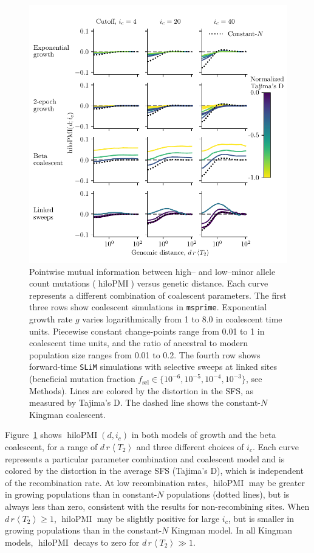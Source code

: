 \documentclass[11pt, letterpaper]{article}   	%
\newcommand{\Fig}[1]{Figure~\ref{#1}}
\newcommand{\E}[1]{\left< #1 \right>}
\DeclareMathOperator{\hilopmi}{hiloPMI}
\begin{document}
\begin{figure}
\centering
\includegraphics[scale=1]{figures/hilopmi_vs_distance.pdf}
\caption{Pointwise mutual information between high-- and low--minor allele count mutations ($\hilopmi$) versus genetic distance. Each curve represents a different combination of coalescent parameters. The first three rows show coalescent simulations in \texttt{msprime}. Exponential growth rate $g$ varies logarithmically from 1 to 8.0 in coalescent time units. Piecewise constant change-points range from 0.01 to 1 in coalescent time units, and the ratio of ancestral to modern population size ranges from 0.01 to 0.2. The fourth row shows forward-time \texttt{SLiM} simulations with selective sweeps at linked sites (beneficial mutation fraction $f_{\text{sel}} \in \{10^{-6}, 10^{-5}, 10^{-4}, 10^{-3}\}$, see Methods). Lines are colored by the distortion in the SFS, as measured by Tajima's D. The dashed line shows the constant-$N$ Kingman coalescent. \label{fig:hilo_vs_d}}
\end{figure}

\Fig{fig:hilo_vs_d} shows $\hilopmi(d,i_c)$ in both models of growth and the beta coalescent, for a range of $d\,r \E{T_2}$ and three different choices of $i_c$.
Each curve represents a particular parameter combination and coalescent model and is colored by the distortion in the average SFS (Tajima's D), which is independent of the recombination rate.
At low recombination rates, $\hilopmi$ may be greater in growing populations than in constant-$N$ populations (dotted lines), but is always less than zero, consistent with the results for non-recombining sites.
When $d\,r \E{T_2}\geq 1$, $\hilopmi$ may be slightly positive for large $i_c$, but is smaller in growing populations than in the constant-$N$ Kingman model.
In all Kingman models, $\hilopmi$ decays to zero for $d\,r \E{T_2}\gg 1$.
\end{document}
